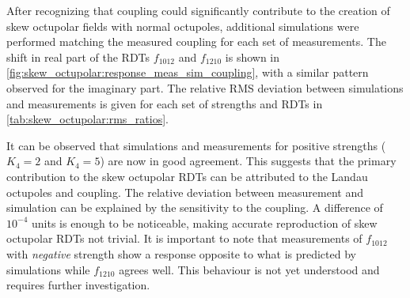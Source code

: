 After recognizing that coupling could significantly contribute to the creation of skew
octupolar fields with normal octupoles, additional simulations were performed matching the measured
coupling for each set of measurements. The shift in real part of the RDTs $f_{1012}$ and $f_{1210}$
is shown in \cref{fig:skew_octupolar:response_meas_sim_coupling}, with a similar pattern observed
for the imaginary part. The relative RMS deviation between simulations and measurements is given
for each set of strengths and RDTs in \cref{tab:skew_octupolar:rms_ratios}.

It can be observed that simulations and measurements for positive strengths ($K_4=2$ and $K_4=5$) 
are now in good agreement. This suggests that the primary contribution to the skew octupolar RDTs
can be attributed to the Landau octupoles and coupling. The relative deviation between measurement
and simulation can be explained by the sensitivity to the coupling. A difference of $10^{-4}$ units 
is enough to be noticeable, making accurate reproduction of skew octupolar RDTs not trivial.
It is important to note that measurements of $f_{1012}$ with \textit{negative} strength show a
response opposite to what is predicted by simulations while $f_{1210}$ agrees well. This behaviour
is not yet understood and requires further investigation.

